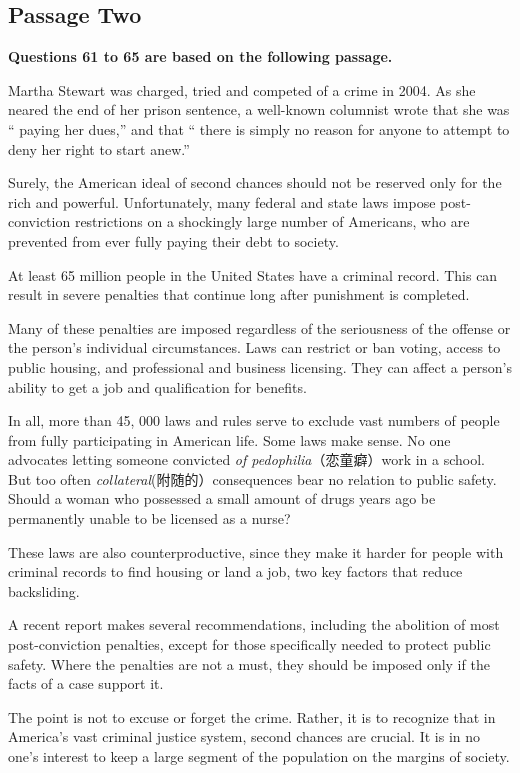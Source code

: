 \documentclass[UTF8,11pt]{ctexart}
\begin{document}
\subsection*{\textbf{Passage Two}}


\textbf{Questions 61 to 65 are based on the following passage.}


Martha Stewart was charged, tried and competed of a crime in 2004. As she neared the end of her prison sentence, a well-known columnist wrote that she was “ paying her dues,” and that “ there is simply no reason for anyone to attempt to deny her right to start anew.”


Surely, the American ideal of second chances should not be reserved only for the rich and powerful. Unfortunately, many federal and state laws impose post-conviction restrictions on a shockingly large number of Americans, who are prevented from ever fully paying their debt to society.


At least 65 million people in the United States have a criminal record. This can result in severe penalties that continue long after punishment is completed.


Many of these penalties are imposed regardless of the seriousness of the offense or the person’s individual circumstances. Laws can restrict or ban voting, access to public housing, and professional and business licensing. They can affect a person’s ability to get a job and qualification for benefits.


In all, more than 45, 000 laws and rules serve to exclude vast numbers of people from fully participating in American life. Some laws make sense. No one advocates letting someone convicted\textit{ of pedophilia}（恋童癖）work in a school. But too often\textit{ collateral}(附随的）consequences bear no relation to public safety. Should a woman who possessed a small amount of drugs years ago be permanently unable to be licensed as a nurse?


These laws are also counterproductive, since they make it harder for people with criminal records to find housing or land a job, two key factors that reduce backsliding.


A recent report makes several recommendations, including the abolition of most post-conviction penalties, except for those specifically needed to protect public safety. Where the penalties are not a must, they should be imposed only if the facts of a case support it.


The point is not to excuse or forget the crime. Rather, it is to recognize that in America’s vast criminal justice system, second chances are crucial. It is in no one’s interest to keep a large segment of the population on the margins of society.
\end{document}
